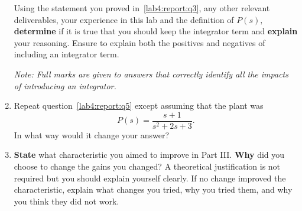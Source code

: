 \begin{deliverable}[label={lab4:report}]
\begin{enumerate}[label={(\arabic*)}]
{      Using the statement you proved in~\ref{lab4:report:q3}, any other relevant deliverables, your experience in this lab and the definition of \(P(s),\) \textbf{determine} if it is true that you should keep the integrator term and \textbf{explain} your reasoning. Ensure to explain both the positives and negatives of including an integrator term.

      \emph{Note: Full marks are given to answers that correctly identify all the impacts of introducing an integrator.}
      \label{lab4:report:q5}
    }
    \item{%
      Repeat question~\ref{lab4:report:q5} except assuming that the plant was
      \[
        P(s) = \frac{s + 1}{s^2 + 2 s + 3}.
      \]
      In what way would it change your answer?
      \label{lab4:report:q6}
    }
    \item{%
      \textbf{State} what characteristic you aimed to improve in Part III.
      \textbf{Why} did you choose to change the gains you changed?
      A theoretical justification is not required but you should explain yourself clearly.
      If no change improved the characteristic, explain what changes you tried, why you tried them, and why you think they did not work.
      \label{lab4:report:q7}
    }
  \end{enumerate}
\end{deliverable}

